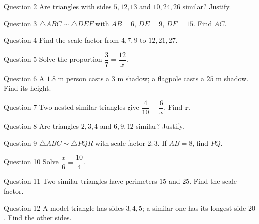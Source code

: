 \documentclass[11pt]{article}
\begin{document}
\begin{qbox}{Question 2}
Are triangles with sides $5,12,13$ and $10,24,26$ similar? Justify.\workspace{2.2cm}
\end{qbox}

\begin{qbox}{Question 3}
$\triangle ABC\sim\triangle DEF$ with $AB=6$, $DE=9$, $DF=15$. Find $AC$.\workspace{2.2cm}
\end{qbox}

\begin{qbox}{Question 4}
Find the scale factor from $4,7,9$ to $12,21,27$.\workspace{2.0cm}
\end{qbox}

\begin{qbox}{Question 5}
Solve the proportion $\dfrac{3}{7}=\dfrac{12}{x}$.\workspace{2.0cm}
\end{qbox}

\begin{qbox}{Question 6}
A $1.8$ m person casts a $3$ m shadow; a flagpole casts a $25$ m shadow. Find its height.\workspace{2.4cm}
\end{qbox}

\begin{qbox}{Question 7}
Two nested similar triangles give $\dfrac{4}{10}=\dfrac{6}{x}$. Find $x$.\workspace{2.2cm}
\end{qbox}

\begin{qbox}{Question 8}
Are triangles $2,3,4$ and $6,9,12$ similar? Justify.\workspace{2.2cm}
\end{qbox}

\begin{qbox}{Question 9}
$\triangle ABC\sim\triangle PQR$ with scale factor $2:3$. If $AB=8$, find $PQ$.\workspace{2.0cm}
\end{qbox}

\begin{qbox}{Question 10}
Solve $\dfrac{x}{6}=\dfrac{10}{4}$.\workspace{2.0cm}
\end{qbox}

\begin{qbox}{Question 11}
Two similar triangles have perimeters $15$ and $25$. Find the scale factor.\workspace{2.0cm}
\end{qbox}

\begin{qbox}{Question 12}
A model triangle has sides $3,4,5$; a similar one has its longest side $20$. Find the other sides.\workspace{2.4cm}
\end{qbox}
\end{document}
